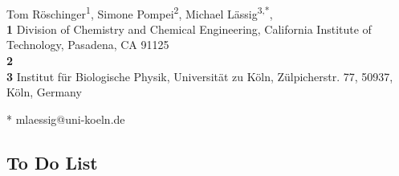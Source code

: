 \documentclass[10pt,a4paper]{article}
\date{}
\begin{document}
	\vspace*{0.2in}

	\begin{flushleft}
		{\Large
			\textbf{}
		}
		\newline
		\\
		Tom R\"oschinger\textsuperscript{1},
		Simone Pompei\textsuperscript{2},
		Michael L\"assig\textsuperscript{3,*},
		\\
		\bigskip
		\textbf{1} Division of Chemistry and Chemical Engineering, California Institute of Technology, Pasadena, CA 91125 \\
		\textbf{2} \\
		\textbf{3} Institut f\"ur Biologische Physik, Universit\"at zu K\"oln,
		Z\"ulpicherstr. 77, 50937, K\"oln, Germany
		\\
		\bigskip


		* mlaessig@uni-koeln.de

	\end{flushleft}
	\subsection*{To Do List}
	
\end{document}
